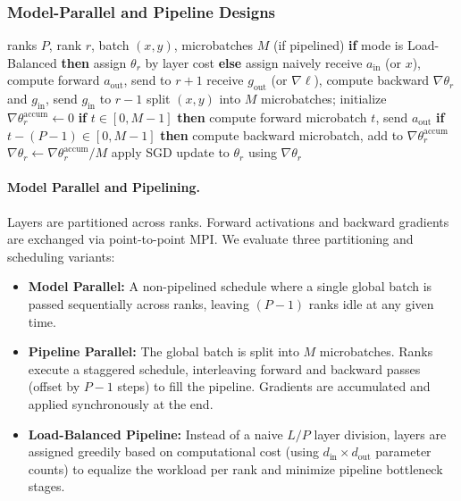 \documentclass[11pt]{article}
\begin{document}
\subsubsection{Model-Parallel and Pipeline Designs}
\begin{algorithm}[H]
\caption{Model-Parallel batch step (Sequential / Pipeline / Load-Balanced)}
\label{alg:mp_unified}
\begin{algorithmic}[1]
  \Require ranks $P$, rank $r$, batch $(x,y)$, microbatches $M$ (if pipelined)
  \State \textbf{if} mode is Load-Balanced \textbf{then} assign $\theta_r$ by layer cost \textbf{else} assign naively
    \State receive $a_{\text{in}}$ (or $x$), compute forward $a_{\text{out}}$, send to $r+1$
    \State receive $g_{\text{out}}$ (or $\nabla \ell$), compute backward $\nabla \theta_r$ and $g_{\text{in}}$, send $g_{\text{in}}$ to $r-1$
    \State split $(x,y)$ into $M$ microbatches; initialize $\nabla \theta_r^{\text{accum}} \leftarrow 0$
      \State \textbf{if} $t \in [0, M-1]$ \textbf{then} compute forward microbatch $t$, send $a_{\text{out}}$
      \State \textbf{if} $t - (P - 1) \in [0, M-1]$ \textbf{then} compute backward microbatch, add to $\nabla \theta_r^{\text{accum}}$
    \EndFor
    \State $\nabla \theta_r \leftarrow \nabla \theta_r^{\text{accum}} / M$
  \EndIf
  \State apply SGD update to $\theta_r$ using $\nabla \theta_r$
\end{algorithmic}
\end{algorithm}
\paragraph{Model Parallel and Pipelining.}
Layers are partitioned across ranks. Forward activations and backward gradients are exchanged via point-to-point MPI. We evaluate three partitioning and scheduling variants:
\begin{itemize}[nosep]
  \item \textbf{Model Parallel:} A non-pipelined schedule where a single global batch is passed sequentially across ranks, leaving $(P-1)$ ranks idle at any given time.
  \item \textbf{Pipeline Parallel:} The global batch is split into $M$ microbatches. Ranks execute a staggered schedule, interleaving forward and backward passes (offset by $P-1$ steps) to fill the pipeline. Gradients are accumulated and applied synchronously at the end.
  \item \textbf{Load-Balanced Pipeline:} Instead of a naive $L/P$ layer division, layers are assigned greedily based on computational cost (using $d_{\text{in}} \times d_{\text{out}}$ parameter counts) to equalize the workload per rank and minimize pipeline bottleneck stages.
\end{itemize}
\end{document}

